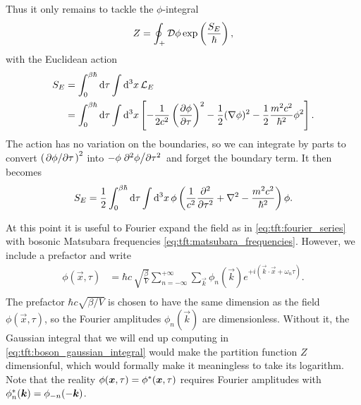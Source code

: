 Thus it only remains to tackle the $\phi$-integral
\begin{equation}
	Z = \oint_+ \mathcal{D} \phi \exp \left( \frac{S_E}{\hbar} \right) ,
\label{eq:tft:boson_partition_function_momentum_out}
\end{equation}
with the Euclidean action
\begin{equation}
\begin{split}
	S_E &= \int_0^{\beta \hbar} \mathop{}\!\mathrm{d} \tau \int \mathop{}\!\mathrm{d}^3 x \, \mathcal{L}_E \\
	    &= \int_0^{\beta \hbar} \mathop{}\!\mathrm{d} \tau \int \mathop{}\!\mathrm{d}^3 x \left[ - \frac{1}{2c^2} \pdv{\phi}{\tau}^2 - \frac12 (\nabla \phi)^2 - \frac12 \frac{m^2 c^2}{\hbar^2} \phi^2 \right] .
\end{split}
\label{eq:tft:boson_euclidean_action_definition}
\end{equation}
The action has no variation on the boundaries, so we can integrate by parts to convert $\pdv{\phi}/{\tau}^2$ into $-\phi \pdv[2]{\phi}/{\tau}$ and forget the boundary term.
It then becomes
\begin{equation}
	S_E = \frac12 \int_0^{\beta \hbar} \mathop{}\!\mathrm{d} \tau \int \mathop{}\!\mathrm{d}^3 x \, \phi \left( \frac{1}{c^2} \pdv[2]{}{\tau} + \nabla^2 - \frac{m^2 c^2}{\hbar^2} \right) \phi .
\label{eq:tft:boson_euclidean_action_nice}
\end{equation}

At this point it is useful to Fourier expand the field as in \eqref{eq:tft:fourier_series} with bosonic Matsubara frequencies \eqref{eq:tft:matsubara_frequencies}.
However, we include a prefactor and write
\begin{equation}
\begin{split}
	\phi(\vec{x}, \tau) & = \hbar c \, \sqrt{\frac{\beta}{V}} \sum_{n=-\infty}^{+\infty} \sum_{\vec{k}}      \phi_n(\vec{k})  e^{+i (\vec{k} \cdot \vec{x} + \omega_n \tau)} . \\
\end{split}
\label{eq:tft:boson_fourier_series}
\end{equation}
The prefactor $\hbar c \sqrt{\beta/V}$ is chosen to have the same dimension as the field $\phi(\vec{x}, \tau)$, so the Fourier amplitudes $\phi_n(\vec{k})$ are dimensionless.
Without it, the Gaussian integral that we will end up computing in \cref{eq:tft:boson_gaussian_integral} would make the partition function $Z$ dimensionful, which would formally make it meaningless to take its logarithm.
Note that the reality $\phi({\bm{x}}, \tau) = {\phi}^*({\bm{x}}, \tau)$ requires Fourier amplitudes with ${\phi}^*_n({\bm{k}}) = \phi_{-n}(-{\bm{k}})$.

